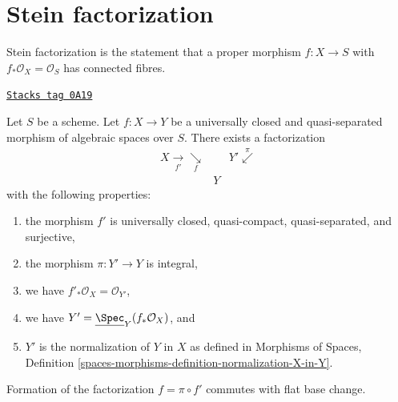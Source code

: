 \section{Stein factorization}
\label{spaces-more-morphisms-section-stein-factorization}
Stein factorization is the statement that a proper morphism $f : X \to S$
with $f_*\mathcal{O}_X = \mathcal{O}_S$ has connected fibres.

\begin{lemma}
\label{spaces-more-morphisms-lemma-stein-universally-closed}
\href{https://stacks.math.columbia.edu/tag/0A19}{\texttt{Stacks tag 0A19}}

Let $S$ be a scheme. Let $f : X \to Y$ be a universally closed and
quasi-separated morphism of algebraic spaces over $S$.
There exists a factorization
$$
\begin{array}{ccc}X \underset{f'}{\longrightarrow}\underset{f}{\searrow} &  & Y' \overset{\pi}{\swarrow} \\  & Y & \end{array}
$$
with the following properties:
\begin{enumerate}
\item the morphism $f'$ is universally closed, quasi-compact, quasi-separated,
and surjective,
\item the morphism $\pi : Y' \to Y$ is integral,
\item we have $f'_*\mathcal{O}_X = \mathcal{O}_{Y'}$,
\item we have $Y' = \underline{\Spec}_Y(f_*\mathcal{O}_X)$, and
\item $Y'$ is the normalization of $Y$ in $X$ as defined in
Morphisms of Spaces, Definition
\ref{spaces-morphisms-definition-normalization-X-in-Y}.
\end{enumerate}
Formation of the factorization $f = \pi \circ f'$ commutes with flat
base change.
\end{lemma}

